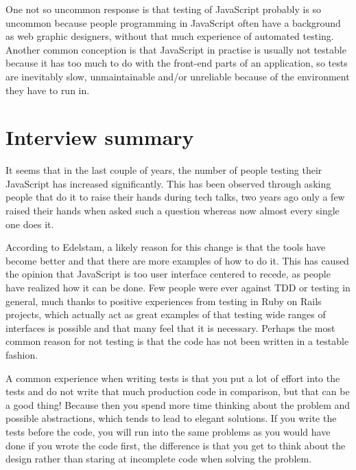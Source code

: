 \documentclass[11pt]{article}
\begin{document}
One not so uncommon response is that testing of JavaScript probably is so uncommon because people programming in JavaScript often have a background as web graphic designers, without that much experience of automated testing. Another common conception is that JavaScript in practise is usually not testable because it has too much to do with the front-end parts of an application, so tests are inevitably slow, unmaintainable and/or unreliable because of the environment they have to run in.

\section{Interview summary}

It seems that in the last couple of years, the number of people testing their JavaScript has increased significantly\cite[question~1]{Edelstam}. This has been observed through asking people that do it to raise their hands during tech talks, two years ago only a few raised their hands when asked such a question whereas now almost every single one does it.

According to Edelstam, a likely reason for this change is that the tools have become better and that there are more examples of how to do it. This has caused the opinion that JavaScript is too user interface centered to recede, as people have realized how it can be done. Few people were ever against TDD or testing in general, much thanks to positive experiences from testing in Ruby on Rails projects, which actually act as great examples of that testing wide ranges of interfaces is possible and that many feel that it is necessary. Perhaps the most common reason for not testing is that the code has not been written in a testable fashion. \cite[questions~2-3]{Edelstam}

A common experience when writing tests is that you put a lot of effort into the tests and do not write that much production code in comparison, but that can be a good thing! Because then you spend more time thinking about the problem and possible abstractions, which tends to lead to elegant solutions. If you write the tests before the code, you will run into the same problems as you would have done if you wrote the code first, the difference is that you get to think about the design rather than staring at incomplete code when solving the problem. \cite[question~8]{Edelstam}
\end{document}
